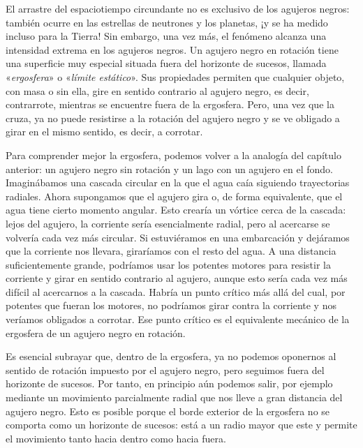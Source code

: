 El arrastre del espaciotiempo circundante no es exclusivo de los agujeros negros: también ocurre en las estrellas de neutrones y los planetas, ¡y se ha medido incluso para la Tierra! Sin embargo, una vez más, el fenómeno alcanza una intensidad extrema en los agujeros negros. Un agujero negro en rotación tiene una superficie muy especial situada fuera del horizonte de sucesos, llamada «\emph{ergosfera}» o «\emph{límite estático}». Sus propiedades permiten que cualquier objeto, con masa o sin ella, gire en sentido contrario al agujero negro, es decir, contrarrote, mientras se encuentre fuera de la ergosfera. Pero, una vez que la cruza, ya no puede resistirse a la rotación del agujero negro y se ve obligado a girar en el mismo sentido, es decir, a corrotar.

Para comprender mejor la ergosfera, podemos volver a la analogía del capítulo anterior: un agujero negro sin rotación y un lago con un agujero en el fondo. Imaginábamos una cascada circular en la que el agua caía siguiendo trayectorias radiales. Ahora supongamos que el agujero gira o, de forma equivalente, que el agua tiene cierto momento angular. Esto crearía un vórtice cerca de la cascada: lejos del agujero, la corriente sería esencialmente radial, pero al acercarse se volvería cada vez más circular. Si estuviéramos en una embarcación y dejáramos que la corriente nos llevara, giraríamos con el resto del agua. A una distancia suficientemente grande, podríamos usar los potentes motores para resistir la corriente y girar en sentido contrario al agujero, aunque esto sería cada vez más difícil al acercarnos a la cascada. Habría un punto crítico más allá del cual, por potentes que fueran los motores, no podríamos girar contra la corriente y nos veríamos obligados a corrotar. Ese punto crítico es el equivalente mecánico de la ergosfera de un agujero negro en rotación.

Es esencial subrayar que, dentro de la ergosfera, ya no podemos oponernos al sentido de rotación impuesto por el agujero negro, pero seguimos fuera del horizonte de sucesos. Por tanto, en principio aún podemos salir, por ejemplo mediante un movimiento parcialmente radial que nos lleve a gran distancia del agujero negro. Esto es posible porque el borde exterior de la ergosfera no se comporta como un horizonte de sucesos: está a un radio mayor que este y permite el movimiento tanto hacia dentro como hacia fuera.

